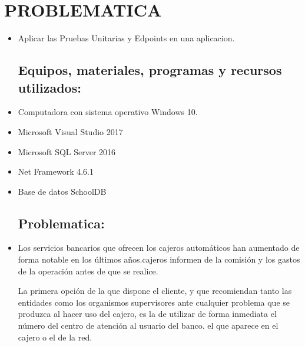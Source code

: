 \section{PROBLEMATICA} 

\begin{itemize}
\subsection{Objetivos:}
	\item Aplicar las Pruebas Unitarias y Edpoints en una aplicacion.

\subsection{Equipos, materiales, programas y recursos utilizados:}
	\item Computadora con sistema operativo Windows 10.
	\item Microsoft Visual Studio 2017
	\item Microsoft SQL Server 2016
	\item Net Framework 4.6.1
	\item Base de datos SchoolDB

\subsection{Problematica:}
	\item Los servicios bancarios que ofrecen los cajeros automáticos han aumentado de forma notable en los últimos años.cajeros informen de la comisión y los gastos de la operación antes de que se realice.

La primera opción de la que dispone el cliente, y que recomiendan tanto las entidades como los organismos supervisores ante cualquier problema que se produzca al hacer uso del cajero, es la de utilizar de forma inmediata el número del centro de atención al usuario del banco. el que aparece en el cajero o el de la red.

\end{itemize}